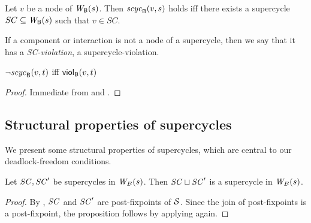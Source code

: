


\begin{definition}
\label{defn:supercycle.membership}
Let $v$ be a node of $\wfg{\B}{s}$. Then
$\scyc{\B}{s}{v}$ holds iff there exists a supercycle $SC \sub
\wfg{\B}{s}$ such that $v \in SC$. 
\end{definition}

If a component or interaction is not a node of a supercycle, then we say that it has a
\emph{SC-violation}, \ie a supercycle-violation.
%



\begin{proposition} \label{prop:scViol-iff-notInSC}
$\neg \scyc{\B}{t}{v}$ iff $\scV{v}{t}$ %
\end{proposition}
%
\begin{proof}
Immediate from  and .
\end{proof}








\subsection{Structural properties of supercycles}
\label{secn:supercycle-structural}


We present some structural properties of supercycles, which
are central to our deadlock-freedom conditions.


\begin{proposition} \label{prop:supercycle:union}
Let $\SC, \SC'$ be supercycles in $\wfg{B}{s}$. Then $\SC \join \SC'$ is
a supercycle in $\wfg{B}{s}$.
\end{proposition}
%
\begin{proof}
By , $\SC$ and $\SC'$ are post-fixpoints of $\SFs$. Since the join of post-fixpoints is a post-fixpoint, 
the proposition follows by applying  again.
\end{proof}





